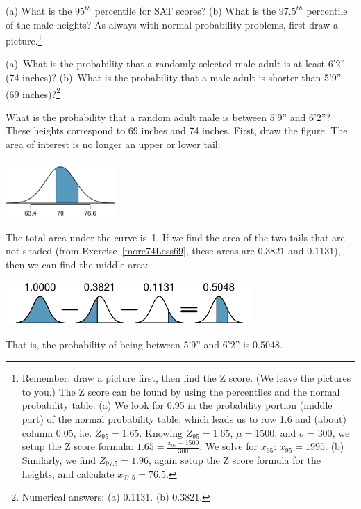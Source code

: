\begin{exercise}
(a) What is the $95^{th}$ percentile for SAT scores? (b) What is the $97.5^{th}$ percentile of the male heights? As always with normal probability problems, first draw a picture.\footnote{Remember: draw a picture first, then find the Z score. (We leave the pictures to you.) The Z score can be found by using the percentiles and the normal probability table. (a) We look for 0.95 in the probability portion (middle part) of the normal probability table, which leads us to row 1.6 and (about) column 0.05, i.e. $Z_{95}=1.65$. Knowing $Z_{95}=1.65$, $\mu = 1500$, and $\sigma = 300$, we setup the Z score formula: $1.65 = \frac{x_{95} - 1500}{300}$. We solve for $x_{95}$: $x_{95} = 1995$. (b) Similarly, we find $Z_{97.5} = 1.96$, again setup the Z score formula for the heights, and calculate $x_{97.5} = 76.5$.}
\end{exercise}

\begin{exercise}\label{more74Less69}
(a)~What is the probability that a randomly selected male adult is at least 6'2'' (74 inches)? (b)~What is the probability that a male adult is shorter than 5'9'' (69 inches)?\footnote{Numerical answers: (a) 0.1131. (b) 0.3821.}
\end{exercise}

\begin{example}{What is the probability that a random adult male is between 5'9'' and 6'2''?}
These heights correspond to 69 inches and 74 inches. First, draw the figure. The area of interest is no longer an upper or lower tail.
\begin{center}
\includegraphics[height=0.85in]{03/figures/between59And62/between59And62}
\end{center}
The total area under the curve is~1. If we find the area of the two tails that are not shaded (from Exercise~\ref{more74Less69}, these areas are $0.3821$ and $0.1131$), then we can find the middle area:
\begin{center}
\includegraphics[height=0.65in]{03/figures/subtracting2Areas/subtracting2Areas}
\end{center}
That is, the probability of being between 5'9'' and 6'2'' is 0.5048.
\end{example}

